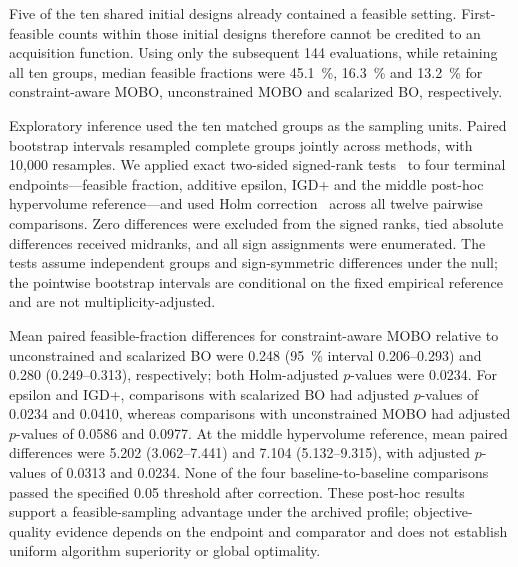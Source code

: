Five of the ten shared initial designs already contained a feasible setting. First-feasible
counts within those initial designs therefore cannot be credited to an acquisition function.
Using only the subsequent 144 evaluations, while retaining all ten groups, median feasible
fractions were \SI{45.1}{\percent}, \SI{16.3}{\percent} and \SI{13.2}{\percent} for
constraint-aware MOBO, unconstrained MOBO and scalarized BO, respectively.

Exploratory inference used the ten matched groups as the sampling units. Paired bootstrap
intervals resampled complete groups jointly across methods, with 10,000 resamples.
We applied exact two-sided signed-rank tests~\cite{Wilcoxon1945} to four terminal endpoints---feasible fraction,
additive epsilon, IGD+ and the middle post-hoc hypervolume reference---and used Holm correction~\cite{Holm1979}
across all twelve pairwise comparisons. Zero differences were excluded from the signed ranks,
tied absolute differences received midranks, and all sign assignments were enumerated.
The tests assume independent groups and sign-symmetric differences under the null; the
pointwise bootstrap intervals are conditional on the fixed empirical reference and are not
multiplicity-adjusted.

Mean paired feasible-fraction differences for constraint-aware MOBO relative to unconstrained
and scalarized BO were 0.248 (\SI{95}{\percent} interval 0.206--0.293) and
0.280 (0.249--0.313), respectively; both Holm-adjusted $p$-values were 0.0234.
For epsilon and IGD+, comparisons with scalarized BO had adjusted $p$-values of 0.0234 and
0.0410, whereas comparisons with unconstrained MOBO had adjusted $p$-values of 0.0586 and
0.0977. At the middle hypervolume reference, mean paired differences were 5.202 (3.062--7.441)
and 7.104 (5.132--9.315), with adjusted $p$-values of 0.0313 and 0.0234. None of the four
baseline-to-baseline comparisons passed the specified 0.05 threshold after correction.
These post-hoc results support a feasible-sampling advantage under the archived profile;
objective-quality evidence depends on the endpoint and comparator and does not establish
uniform algorithm superiority or global optimality.
